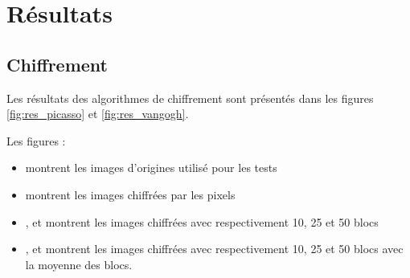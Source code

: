 \documentclass[a4paper]{article}
\begin{document}
    \section{Résultats}

        \subsection{Chiffrement}

            Les résultats des algorithmes de chiffrement sont présentés dans les figures \ref{fig:res_picasso} et \ref{fig:res_vangogh}.

            Les figures :
            \begin{itemize}
                \item {} montrent les images d'origines utilisé pour les tests
                \item {} montrent les images chiffrées par les pixels
                \item {},  et  montrent les images chiffrées avec respectivement 10, 25 et 50 blocs
                \item {},  et  montrent les images chiffrées avec respectivement 10, 25 et 50 blocs avec la moyenne des blocs.
            \end{itemize}
\end{document}
